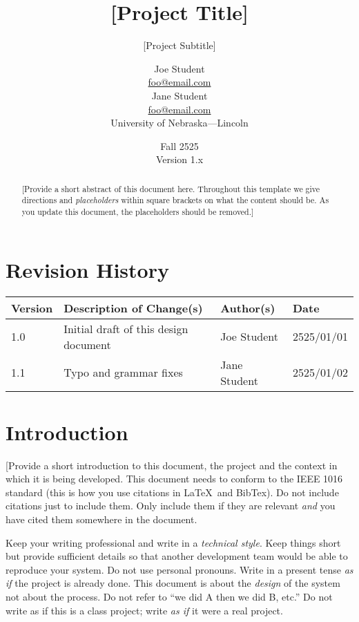 \documentclass[12pt]{scrartcl} %
\title{[Project Title]}
\subtitle{[Project Subtitle]}
\author{Joe Student\\
        \href{mailto:foo@email.com}{foo@email.com} \\
        Jane Student\\
        \href{mailto:foo@email.com}{foo@email.com} \\        
        University of Nebraska---Lincoln\\
}
\date{Fall 2525 \\
      Version 1.x
}
\begin{document}
\maketitle
\thispagestyle{empty}

\vfill

\begin{abstract}
[Provide a short abstract of this document here.  Throughout this template 
we give directions and \emph{placeholders} within square brackets on what 
the content should be.  As you update this document, the placeholders should
be removed.]
\end{abstract}

\newpage
\clearpage
\setcounter{page}{1}
\section*{Revision History}

\begin{tabular}{|l|l|l|l|}
\hline
Version & Description of Change(s) & Author(s) & Date \\
\hline
1.0 & Initial draft of this design document & Joe Student & 2525/01/01 \\
\hline
1.1 & Typo and grammar fixes & Jane Student & 2525/01/02 \\
\hline
\end{tabular}

\newpage
\tableofcontents

\newpage
\section{Introduction}

[Provide a short introduction to this document, the project and the context 
in which it is being developed.  This document needs to conform to the 
IEEE 1016 standard \cite{IEEE1016} (this is how you use citations in \LaTeX\ and BibTex).  
Do not include citations just to include them.  Only include them if they are relevant
\emph{and} you have cited them somewhere in the document.  

Keep your writing professional and write in a \emph{technical style}.  Keep things short but provide
sufficient details so that another development team would be able to reproduce
your system.  Do not use personal pronouns.  Write in a present tense \emph{as if}
the project is already done.  This document is about the \emph{design} of the system
not about the process.  Do not refer to ``we did A then we did B, etc.''  Do not
write as if this is a class project; write \emph{as if} it were a real project.
\end{document}
